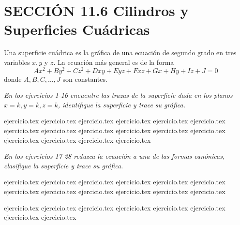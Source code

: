 
\section*{SECCIÓN 11.6 \quad Cilindros y Superficies Cuádricas}

Una superficie cuádrica es la gráfica de una ecuación de segundo grado en tres variables $x, y$ y $z$. La ecuación más general es de la forma
\[
Ax^2 + By^2 + Cz^2 + Dxy + Eyz + Fxz + Gx + Hy + Iz + J = 0
\]
donde $A, B, C, \dots, J$ son constantes.

\vspace{0.5cm}
\noindent\textit{En los ejercicios 1-16 encuentre las trazas de la superficie dada en los planos $x = k, y = k, z = k$, identifique la superficie y trace su gráfica.}

\begin{enumerate}
    {ejercicio.tex}
{ejercicio.tex}
{ejercicio.tex}
{ejercicio.tex}
{ejercicio.tex}
{ejercicio.tex}
{ejercicio.tex}
{ejercicio.tex}
{ejercicio.tex}
{ejercicio.tex}
{ejercicio.tex}
{ejercicio.tex}
{ejercicio.tex}
{ejercicio.tex}
{ejercicio.tex}
{ejercicio.tex}
\end{enumerate}

\vspace{0.3cm}
\noindent\textit{En los ejercicios 17-28 reduzca la ecuación a una de las formas canónicas, clasifique la superficie y trace su gráfica.}

\begin{enumerate}
    \setcounter{enumi}{16}
    {ejercicio.tex}
{ejercicio.tex}
{ejercicio.tex}
{ejercicio.tex}
{ejercicio.tex}
{ejercicio.tex}
{ejercicio.tex}
{ejercicio.tex}
{ejercicio.tex}
{ejercicio.tex}
{ejercicio.tex}
{ejercicio.tex}
\end{enumerate}

\vspace{0.3cm}
\begin{enumerate}
    \setcounter{enumi}{28}
    {ejercicio.tex}
{ejercicio.tex}
{ejercicio.tex}
{ejercicio.tex}
{ejercicio.tex}
{ejercicio.tex}
{ejercicio.tex}
{ejercicio.tex}
\end{enumerate}

